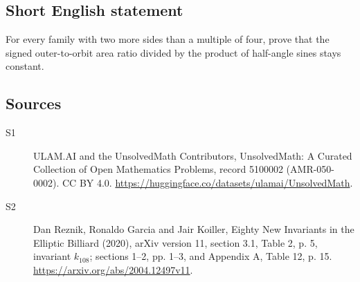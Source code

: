 \documentclass[11pt]{article}
\begin{document}
\subsection{Short English statement}
For every family with two more sides than a multiple of four, prove that the signed outer-to-orbit area ratio divided by the product of half-angle sines stays constant.
\subsection{Sources}
\begin{description}
\item[\hypertarget{source:5100002:1}{S1}] ULAM.AI and the UnsolvedMath Contributors, UnsolvedMath: A Curated Collection of Open Mathematics Problems, record 5100002 (AMR-050-0002). CC BY 4.0. \url{https://huggingface.co/datasets/ulamai/UnsolvedMath}.
\item[\hypertarget{source:5100002:2}{S2}] Dan Reznik, Ronaldo Garcia and Jair Koiller, Eighty New Invariants in the Elliptic Billiard (2020), arXiv version 11, section 3.1, Table 2, p. 5, invariant $k_{108}$; sections 1--2, pp. 1--3, and Appendix A, Table 12, p. 15. \url{https://arxiv.org/abs/2004.12497v11}.
\end{description}
\label{end:5100002}
\end{document}
